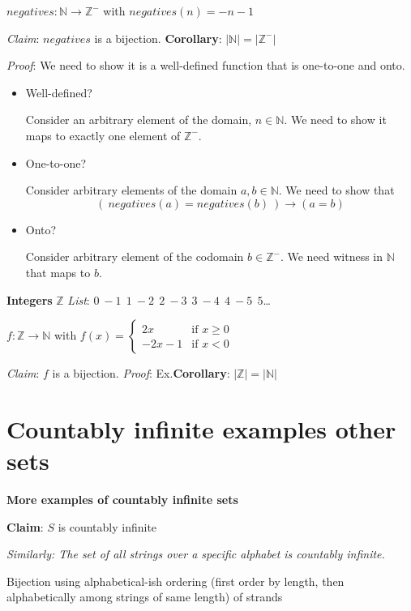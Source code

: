 \documentclass[12pt, oneside]{article}
\begin{document}
$negatives: \mathbb{N} \to \mathbb{Z}^-$ with $negatives(n) = -n-1$

{\it Claim}: $negatives$ is a bijection. \hfill {\bf Corollary}: $ | \mathbb{N} | = |\mathbb{Z}^-|$

{\it Proof}: We need to show it is a well-defined function that is one-to-one and onto.

\begin{itemize}
\item Well-defined? 

Consider an arbitrary element of the domain, $n \in \mathbb{N}$. We need to show it maps to exactly one element of $\mathbb{Z}^-$.

\vfill

\item One-to-one?


Consider arbitrary elements of the domain $a, b \in \mathbb{N}$. We need to show that 
$$\left(~negatives(a) = negatives(b) ~\right) \to (a=b)$$

\vfill

\item Onto?

Consider arbitrary element of the codomain $b \in \mathbb{Z}^-$. We need witness in $\mathbb{N}$ that maps to $b$.

\vfill
\end{itemize}

{\bf Integers} $\mathbb{Z}$ \hfill {\it List}:  $0~-1~~1~-2~~2~-3~~3~-4~~4~-5~~5$\ldots

$f: \mathbb{Z} \to \mathbb{N}$ with $f(x) = \begin{cases}2x &\text{if $x \geq 0$} \\-2x-1 &\text{if $x < 0$} \end{cases}$

{\it Claim}: $f$ is a bijection.  {\it Proof}: Ex.\hfill {\bf Corollary}: $ | \mathbb{Z} | = |\mathbb{N}|$
\newpage


 \vfill
\section*{Countably infinite examples other sets}


{\bf More examples of countably infinite sets}

{\bf Claim}: $S$ is countably infinite

{\it Similarly: The set of all strings over a specific alphabet is countably infinite.}
\begin{center}
Bijection using alphabetical-ish ordering
(first order by length, then alphabetically among strings of same length) 
of strands
\end{center}
\end{document}

